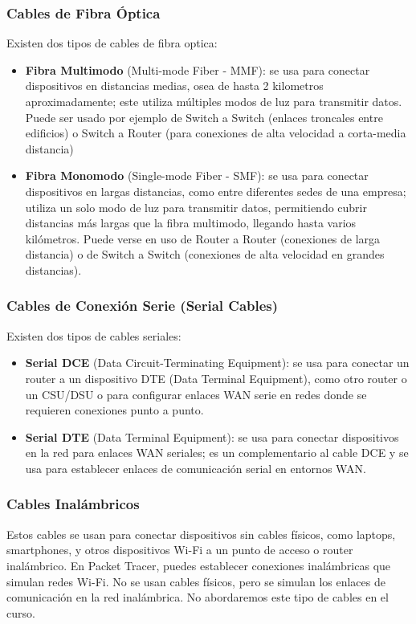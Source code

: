 \documentclass{article}
\begin{document}
\subsubsection{Cables de Fibra Óptica}
Existen dos tipos de cables de fibra optica: 
\begin{itemize}
    \item \textbf{Fibra Multimodo} (Multi-mode Fiber - MMF): se usa para conectar dispositivos en distancias medias, osea de hasta 2 kilometros aproximadamente; este utiliza múltiples modos de luz para transmitir datos. Puede ser usado por ejemplo de  Switch a Switch (enlaces troncales entre edificios) o Switch a Router (para conexiones de alta velocidad a corta-media distancia)
    \item \textbf{Fibra Monomodo }(Single-mode Fiber - SMF): se usa para conectar dispositivos en largas distancias, como entre diferentes sedes de una empresa; utiliza un solo modo de luz para transmitir datos, permitiendo cubrir distancias más largas que la fibra multimodo, llegando hasta varios kilómetros. Puede verse en uso de Router a Router (conexiones de larga distancia) o de Switch a Switch (conexiones de alta velocidad en grandes distancias).
\end{itemize}


\subsubsection{Cables de Conexión Serie (Serial Cables)}
Existen dos tipos de cables seriales: 
\begin{itemize}
    \item \textbf{Serial DCE} (Data Circuit-Terminating Equipment): se usa para conectar un router a un dispositivo DTE (Data Terminal Equipment), como otro router o un CSU/DSU o para configurar enlaces WAN serie en redes donde se requieren conexiones punto a punto.
    \item \textbf{Serial DTE} (Data Terminal Equipment): se usa para conectar dispositivos en la red para enlaces WAN seriales; es un complementario al cable DCE y se usa para establecer enlaces de comunicación serial en entornos WAN.
\end{itemize}


\subsubsection{Cables Inalámbricos}
Estos cables se usan para conectar dispositivos sin cables físicos, como laptops, smartphones, y otros dispositivos Wi-Fi a un punto de acceso o router inalámbrico. En Packet Tracer, puedes establecer conexiones inalámbricas que simulan redes Wi-Fi. No se usan cables físicos, pero se simulan los enlaces de comunicación en la red inalámbrica. No abordaremos este tipo de cables en el curso.
\end{document}
